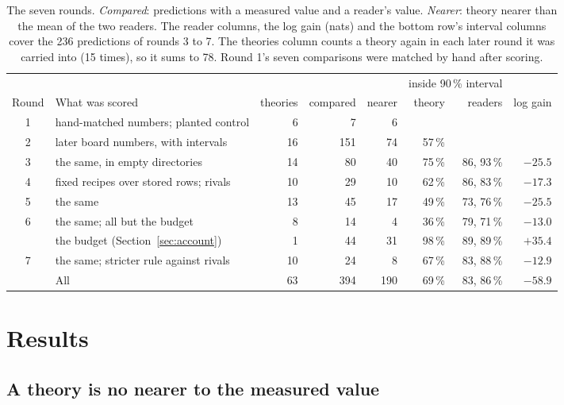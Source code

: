 \documentclass[10pt]{article}
\begin{document}
\begin{table}[h]
\centering\small
\setlength{\tabcolsep}{4.5pt}
\begin{tabular}{@{}clrrrrrr@{}}
\toprule
 & & & & & \multicolumn{2}{c}{inside 90\,\% interval} & \\
\cmidrule(lr){6-7}
Round & What was scored & theories & compared & nearer & theory & readers & log gain \\
\midrule
1 & hand-matched numbers; planted control & 6 & 7 & 6 & & & \\
2 & later board numbers, with intervals & 16 & 151 & 74 & 57\,\% & & \\
3 & the same, in empty directories & 14 & 80 & 40 & 75\,\% & 86, 93\,\% & $-25.5$ \\
4 & fixed recipes over stored rows; rivals & 10 & 29 & 10 & 62\,\% & 86, 83\,\% & $-17.3$ \\
5 & the same & 13 & 45 & 17 & 49\,\% & 73, 76\,\% & $-25.5$ \\
6 & the same; all but the budget & 8 & 14 & 4 & 36\,\% & 79, 71\,\% & $-13.0$ \\
  & \quad the budget (Section~\ref{sec:account}) & 1 & 44 & 31 & 98\,\% & 89, 89\,\% & $+35.4$ \\
7 & the same; stricter rule against rivals & 10 & 24 & 8 & 67\,\% & 83, 88\,\% & $-12.9$ \\
\midrule
 & All & 63 & 394 & 190 & 69\,\% & 83, 86\,\% & $-58.9$ \\
\bottomrule
\end{tabular}
\caption{The seven rounds. \emph{Compared}: predictions with a measured value and a reader's value. \emph{Nearer}:
theory nearer than the mean of the two readers. The reader columns, the log gain (nats) and the bottom row's
interval columns cover the 236 predictions of rounds 3 to 7. The theories column counts a theory again in each
later round it was carried into (15 times), so it sums to 78. Round 1's seven comparisons were matched by hand
after scoring.}
\label{tab:rounds}
\end{table}

\section{Results}

\subsection{A theory is no nearer to the measured value}\label{sec:near}
\end{document}
